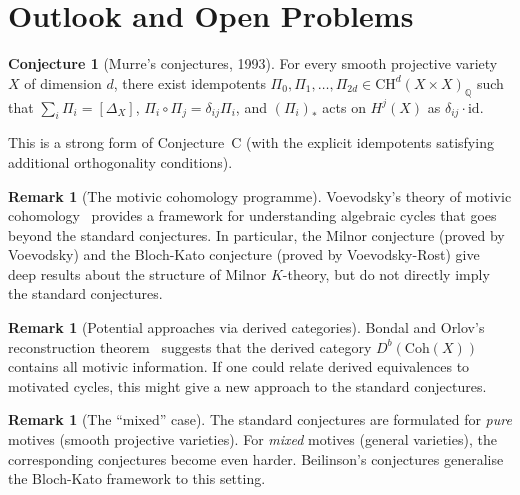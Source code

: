 \documentclass[12pt,a4paper]{amsart}
\theoremstyle{definition}
\newtheorem{remark}[theorem]{Remark}
\newtheorem{conjecture}[theorem]{Conjecture}
\newcommand{\Q}{\mathbb{Q}}
\newcommand{\id}{\mathrm{id}}
\newcommand{\CH}{\mathrm{CH}}
\begin{document}
\section{Outlook and Open Problems}\label{sec:outlook}

\begin{conjecture}[Murre's conjectures, 1993]
For every smooth projective variety $X$ of dimension $d$, there exist
idempotents $\Pi_0, \Pi_1, \ldots, \Pi_{2d} \in \CH^d(X \times X)_\Q$ such
that $\sum_i \Pi_i = [\Delta_X]$, $\Pi_i \circ \Pi_j = \delta_{ij} \Pi_i$,
and $(\Pi_i)_*$ acts on $H^j(X)$ as $\delta_{ij}\cdot\id$.
\end{conjecture}

This is a strong form of Conjecture~C (with the explicit idempotents satisfying
additional orthogonality conditions).

\begin{remark}[The motivic cohomology programme]
Voevodsky's theory of motivic cohomology~\cite{voevodsky2000} provides a
framework for understanding algebraic cycles that goes beyond the standard
conjectures.  In particular, the Milnor conjecture (proved by Voevodsky) and
the Bloch-Kato conjecture (proved by Voevodsky-Rost) give deep results about
the structure of Milnor $K$-theory, but do not directly imply the standard
conjectures.
\end{remark}

\begin{remark}[Potential approaches via derived categories]
Bondal and Orlov's reconstruction theorem~\cite{bondal2001} suggests that
the derived category $D^b(\mathrm{Coh}(X))$ contains all motivic information.
If one could relate derived equivalences to motivated cycles, this might give
a new approach to the standard conjectures.
\end{remark}

\begin{remark}[The ``mixed'' case]
The standard conjectures are formulated for \emph{pure} motives (smooth
projective varieties).  For \emph{mixed} motives (general varieties), the
corresponding conjectures become even harder.  Beilinson's conjectures
\cite{beilinson1985} generalise the Bloch-Kato framework to this setting.
\end{remark}
\end{document}
